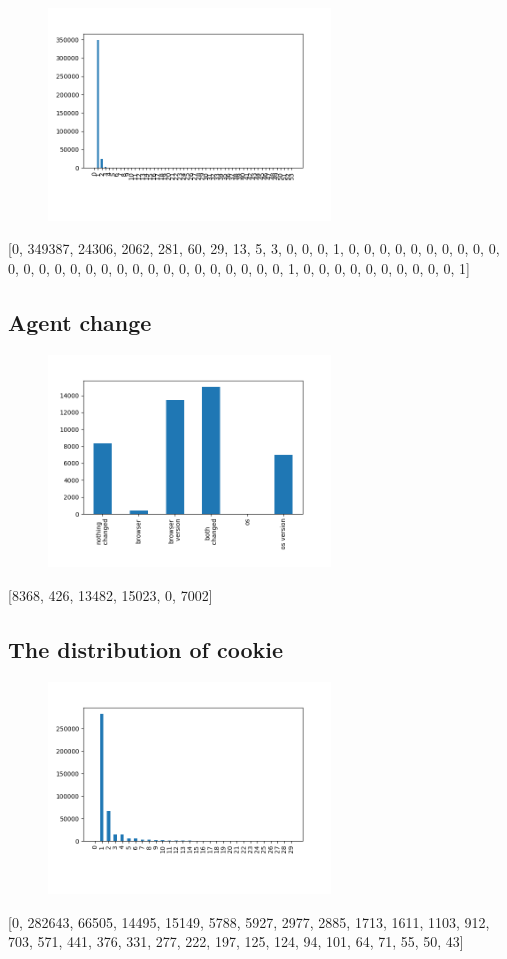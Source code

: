 \documentclass[10pt, conference, compsocconf]{IEEEtran}
\begin{document}
\begin{figure}[H]\centering\includegraphics[width=75mm,scale=0.5]{BasedonClientIDnumdevice}\end{figure}[0, 349387, 24306, 2062, 281, 60, 29, 13, 5, 3, 0, 0, 0, 1, 0, 0, 0, 0, 0, 0, 0, 0, 0, 0, 0, 0, 0, 0, 0, 0, 0, 0, 0, 0, 0, 0, 0, 0, 0, 0, 0, 0, 1, 0, 0, 0, 0, 0, 0, 0, 0, 0, 0, 1]\subsection{Agent change}
\begin{figure}[H]\centering\includegraphics[width=75mm,scale=0.5]{BasedonClientIDagentdis}\end{figure}[8368, 426, 13482, 15023, 0, 7002]\subsection{The distribution of cookie}
\begin{figure}[H]\centering\includegraphics[width=75mm,scale=0.5]{BasedonClientIDcookiedis}\end{figure}[0, 282643, 66505, 14495, 15149, 5788, 5927, 2977, 2885, 1713, 1611, 1103, 912, 703, 571, 441, 376, 331, 277, 222, 197, 125, 124, 94, 101, 64, 71, 55, 50, 43]
\end{document}
